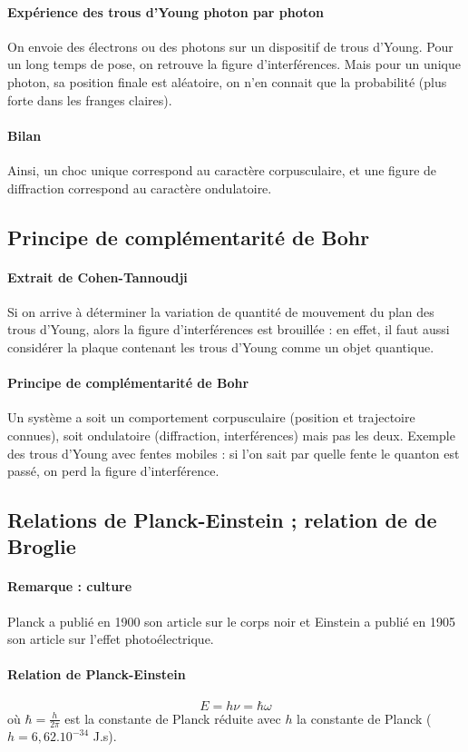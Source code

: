 \documentclass[french]{book}
\theoremstyle{plain}
\theoremstyle{definition}
\theoremstyle{remark}
\begin{document}
\paragraph{Expérience des trous d'Young photon par photon} On envoie des électrons ou des photons sur un dispositif de trous d'Young. Pour un long temps de pose, on retrouve la figure d’interférences. Mais pour un unique photon, sa position finale est aléatoire, on n’en connait que la probabilité (plus forte dans les franges claires).
\paragraph{Bilan} Ainsi, un choc unique correspond au caractère corpusculaire, et une figure de diffraction correspond au caractère ondulatoire.
\subsection{Principe de complémentarité de Bohr}
\paragraph{Extrait de Cohen-Tannoudji} Si on arrive à déterminer la variation de quantité de mouvement du plan des trous d'Young, alors la figure d'interférences est brouillée : en effet, il faut aussi considérer la plaque contenant les trous d'Young comme un objet quantique.
\paragraph{Principe de complémentarité de Bohr} Un système a soit un comportement corpusculaire (position et trajectoire connues), soit ondulatoire (diffraction, interférences) mais pas les deux. Exemple des trous d’Young avec fentes mobiles : si l’on sait par quelle fente le quanton est passé, on perd la figure d’interférence.
\subsection{Relations de Planck-Einstein ; relation de de Broglie}
\paragraph{Remarque : culture} Planck a publié en 1900 son article sur le corps noir et Einstein a publié en 1905 son article sur l'effet photoélectrique.
\paragraph{Relation de Planck-Einstein} $$E=h\nu=\hbar\omega$$ où $\hbar=\displaystyle\frac{h}{2\pi}$ est la constante de Planck réduite avec $h$ la constante de Planck ($h=6,62.10^{-34}$ J.s).
\end{document}
